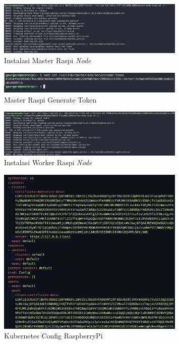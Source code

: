 \begin{figure}[ht]
  \centering
  \includegraphics[width=0.8\textwidth]{resources/chapter-4/pengujian/raspi-03.jpg}
  \caption{Instalasi Master Raspi \textit{Node}}
  \label{fig:instalasi-master-raspi-nodes}
\end{figure}

\begin{figure}[ht]
  \centering
  \includegraphics[width=0.8\textwidth]{resources/chapter-4/pengujian/raspi-token-gen.jpg}
  \caption{Master Raspi Generate Token}
  \label{fig:raspi-master-gen-token}
\end{figure}

\begin{figure}[ht]
  \centering
  \includegraphics[width=0.8\textwidth]{resources/chapter-4/pengujian/raspi-04.jpg}
  \caption{Instalasi Worker Raspi \textit{Node}}
  \label{fig:instalasi-worker-raspi-node}
\end{figure}

\begin{figure}[ht]
  \centering
  \includegraphics[width=0.8\textwidth]{resources/chapter-4/pengujian/raspi-kube-config.jpg}
  \caption{Kubernetes Config RaspberryPi}
  \label{fig:raspi-kube-config}
\end{figure}

